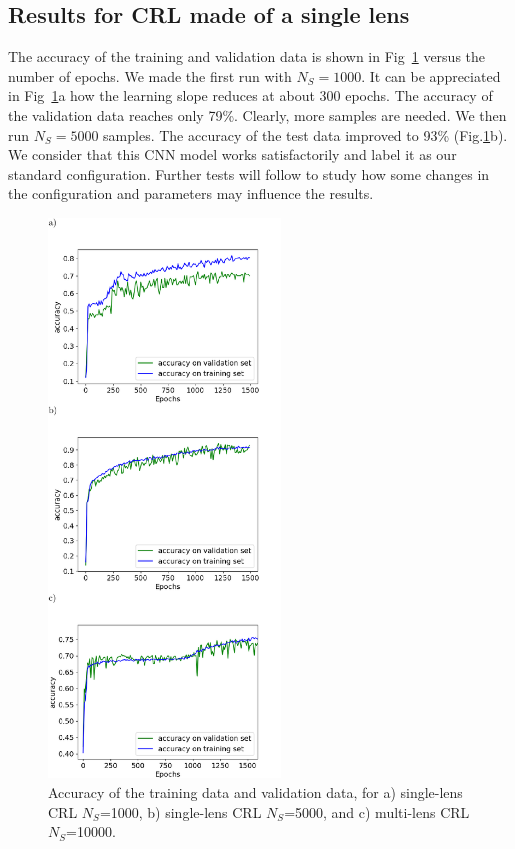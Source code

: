 \documentclass[preprint]{iucr}
\newcommand{\inred}[1]{{\color{red}#1}}
\begin{document}
 \subsection{Results for CRL made of a single lens}
 The accuracy of the training and validation data is shown in Fig~\ref{fig:v12v13} versus the number of epochs.
 We made the first run with $N_S=1000$.
 \inred{It can be appreciated in Fig~\ref{fig:v12v13}a how the learning slope reduces at about 300 epochs. The accuracy of the validation data reaches only 79\%.}
 Clearly, more samples are needed. We then run $N_S=5000$ samples. The accuracy of the test data improved to 93\% (Fig.\ref{fig:v12v13}b). 
 We consider that this CNN model works satisfactorily and label it as our standard configuration. Further tests will follow to study how some changes in the configuration and parameters may influence the results.

\begin{figure}\label{fig:v12v13}
    \includegraphics[width=0.55\textwidth]{figures/figure3.pdf}
    \caption{Accuracy of the training data and validation data, for a) single-lens CRL $N_S$=1000, b) single-lens CRL $N_S$=5000, and c) multi-lens CRL $N_S$=10000.
    }
\end{figure}
\end{document}

